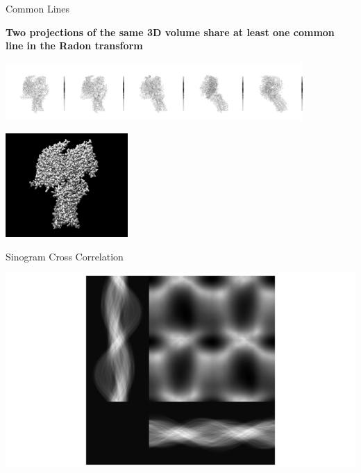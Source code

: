 \documentclass[t, 11pt]{beamer}
\begin{document}
\begin{frame}[fragile]{Common Lines}

  \textbf{Two projections of the same 3D volume share at least one common line in the Radon transform}
 \begin{center}\includegraphics[width=0.85\textwidth]{images/common_line.png}
    \end{center}
 \begin{center}\includegraphics[width=0.35\textwidth]{images/3D_model.png}
    \end{center}

\end{frame}

\begin{frame}[fragile]{Sinogram Cross Correlation}
  \begin{center}\includegraphics[width=1\textwidth]{images/2sin_comp.png}
    \end{center}
\end{frame}
\end{document}
